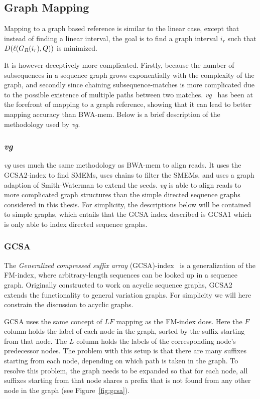 \subsection{Graph Mapping}
\label{sec:graphmapping}
Mapping to a graph based reference is similar to the linear case, except that instead of finding a linear interval, the goal is to find a graph interval $i_r$ such that $D(\ell(G_R(i_r), Q))$ is minimized. 

It is however deceptively more complicated. 
Firstly, because the number of subsequences in a sequence graph grows exponentially with the complexity of the graph, and secondly since chaining subsequence-matches is more complicated due to the possible existence of multiple paths between two matches.
\emph{vg}~\cite{vg} has been at the forefront of mapping to a graph reference, showing that it can lead to better mapping accuracy than BWA-mem. 
Below is a brief description of the methodology used by \emph{vg}.

\subsubsection{\emph{vg}}
\emph{vg} uses much the same methodology as BWA-mem to align reads.
It uses the GCSA2-index to find SMEMs, uses chains to filter the SMEMs, and uses a graph adaption of Smith-Waterman to extend the seeds.
\emph{vg} is able to align reads to more complicated graph structures than the simple directed sequence graphs considered in this thesis.
For simplicity, the descriptions below will be contained to simple graphs, which entails that the GCSA index described is GCSA1\cite{gcsa1} which is only able to index directed sequence graphs.

\subsubsection{GCSA}
The \emph{Generalized compressed suffix array} (GCSA)-index~\cite{gcsa, gcsa2} is a generalization of the FM-index, where arbitrary-length sequences can be looked up in a sequence graph.
Originally constructed to work on acyclic sequence graphs, GCSA2 extends the functionality to general variation graphs.
For simplicity we will here constrain the discussion to acyclic graphs.

GCSA uses the same concept of $LF$ mapping as the FM-index does. Here the $F$ column holds the label of each node in the graph, sorted by the suffix starting from that node. The $L$ column holds the labels of the corresponding node's predecessor nodes.
The problem with this setup is that there are many suffixes starting from each node, depending on which path is taken in the graph.
To resolve this problem, the graph needs to be expanded so that for each node, all suffixes starting from that node shares a prefix that is not found from any other node in the graph (see Figure~\ref{fig:gcsa}).

